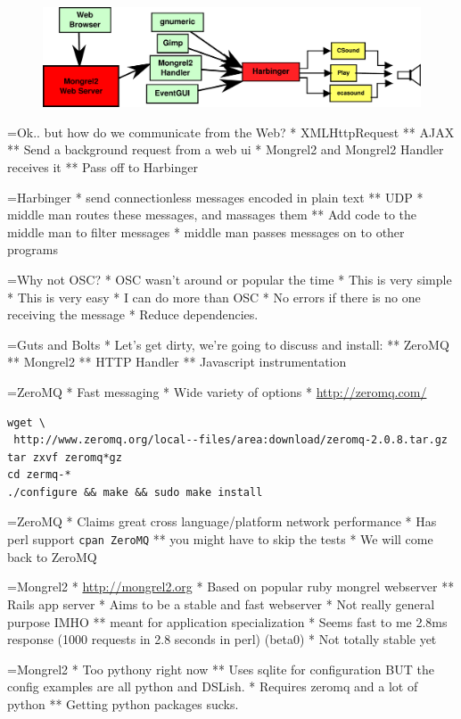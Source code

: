 \documentclass[titlepage,usenames,a4,landscape,semhelv]{seminar}
\begin{document}
\begin{slide}
\newslide

\begin{figure}
  \centering
\includegraphics[width=\textwidth]{mongrel2-example}  
\end{figure}

=Ok.. but how do we communicate from the Web?
* XMLHttpRequest
** AJAX
** Send a background request from a web ui
* Mongrel2 and Mongrel2 Handler receives it
** Pass off to Harbinger

=Harbinger
* send connectionless messages encoded in plain text
** UDP
* middle man routes these messages, and massages them
** Add code to the middle man to filter messages
* middle man passes messages on to other programs
 
=Why not OSC?
* OSC wasn't around or popular the time
* This is very simple
* This is very easy
* I can do more than OSC
* No errors if there is no one receiving the message
* Reduce dependencies.

=Guts and Bolts
* Let's get dirty, we're going to discuss and install:
** ZeroMQ
** Mongrel2
** HTTP Handler
** Javascript instrumentation

=ZeroMQ
* Fast messaging
* Wide variety of options
* \url{http://zeromq.com/}
\begin{verbatim}
wget \
 http://www.zeromq.org/local--files/area:download/zeromq-2.0.8.tar.gz
tar zxvf zeromq*gz
cd zermq-*
./configure && make && sudo make install
\end{verbatim}

=ZeroMQ
* Claims great cross language/platform network performance
* Has perl support \texttt{cpan ZeroMQ}
** you might have to skip the tests
* We will come back to ZeroMQ

=Mongrel2
* \url{http://mongrel2.org}
* Based on popular ruby mongrel webserver
** Rails app server
* Aims to be a stable and fast webserver
* Not really general purpose IMHO
** meant for application specialization
* Seems fast to me 2.8ms response (1000 requests in 2.8 seconds in
perl) (beta0)
* Not totally stable yet

=Mongrel2
* Too pythony right now
** Uses sqlite for configuration BUT the config examples are all
python and DSLish.
* Requires zeromq and a lot of python 
** Getting python packages sucks.


\end{slide}
\end{document}
